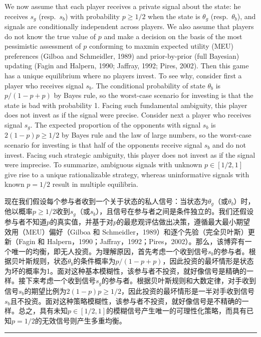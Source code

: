 \documentclass[12pt,a4paper]{article}
\newenvironment{original}
  {\par\medskip\noindent\color{black}\ignorespaces}
  {\par\medskip}
\newenvironment{translation}
  {\par\noindent\color{darkblue}\ignorespaces}
  {\par\medskip\noindent\hrule\par\medskip}
\theoremstyle{definition}
\theoremstyle{remark}
\begin{document}
\begin{original}
We now assume that each player receives a private signal about the state: he receives $s_g$ (resp.\ $s_b$) with probability $p \ge 1/2$ when the state is $\theta_g$ (resp.\ $\theta_b$), and signals are conditionally independent across players. We also assume that players do not know the true value of $p$ and make a decision on the basis of the most pessimistic assessment of $p$ conforming to maxmin expected utility (MEU) preferences (Gilboa and Schmeidler, 1989) and prior-by-prior (full Bayesian) updating (Fagin and Halpern, 1990; Jaffray, 1992; Pires, 2002). Then this game has a unique equilibrium where no players invest. To see why, consider first a player who receives signal $s_b$. The conditional probability of state $\theta_b$ is $p/(1-p+p)$ by Bayes rule, so the worst-case scenario for investing is that the state is bad with probability 1. Facing such fundamental ambiguity, this player does not invest as if the signal were precise. Consider next a player who receives signal $s_g$. The expected proportion of the opponents with signal $s_b$ is $2(1-p)p \ge 1/2$ by Bayes rule and the law of large numbers, so the worst-case scenario for investing is that half of the opponents receive signal $s_b$ and do not invest. Facing such strategic ambiguity, this player does not invest as if the signal were imprecise. To summarize, ambiguous signals with unknown $p \in [1/2, 1]$ give rise to a unique rationalizable strategy, whereas uninformative signals with known $p = 1/2$ result in multiple equilibria.
\end{original}
\begin{translation}
现在我们假设每个参与者收到一个关于状态的私人信号：当状态为$\theta_g$（或$\theta_b$）时，他以概率$p \ge 1/2$收到$s_g$（或$s_b$），且信号在参与者之间是条件独立的。我们还假设参与者不知道$p$的真实值，并基于对$p$的最悲观评估做出决策，遵循最大最小期望效用（MEU）偏好（Gilboa 和 Schmeidler，1989）和逐个先验（完全贝叶斯）更新（Fagin 和 Halpern，1990；Jaffray，1992；Pires，2002）。那么，该博弈有一个唯一的均衡，即无人投资。为理解原因，首先考虑一个收到信号$s_b$的参与者。根据贝叶斯规则，状态$\theta_b$的条件概率为$p/(1-p+p)$，因此投资的最坏情形是状态为坏的概率为1。面对这种基本模糊性，该参与者不投资，就好像信号是精确的一样。接下来考虑一个收到信号$s_g$的参与者。根据贝叶斯规则和大数定律，对手收到信号$s_b$的期望比例为$2(1-p)p \ge 1/2$，因此投资的最坏情形是一半对手收到信号$s_b$且不投资。面对这种策略模糊性，该参与者不投资，就好像信号是不精确的一样。总之，具有未知$p \in [1/2, 1]$的模糊信号产生唯一的可理性化策略，而具有已知$p = 1/2$的无效信号则产生多重均衡。
\end{translation}
\end{document}

